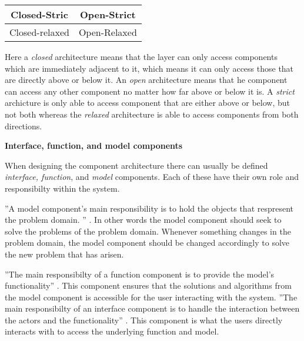 \begin{center}
	\begin{tabular}{| c | c |}
		\hline
		Closed-Stric & Open-Strict \\
		\hline
		Closed-relaxed & Open-Relaxed \\
		\hline
	\end{tabular}
\end{center}

Here a \textit{closed} architecture means that the layer can only access components which are immediately adjacent to it, which means it can only access those that are directly above or below it.
An \textit{open} architecture means that he component can access any other component no matter how far above or below it is.
A \textit{strict} archicture is only able to access component that are either above or below, but not both whereas the \textit{relaxed} architecture is able to access components from both directions.

\textbf{Interface, function, and model components}

When designing the component architecture there can usually be defined \textit{interface, function}, and \textit{model} components.
Each of these have their own role and responsibilty within the system.

''A model component's main responsibility is to hold the objects that respresent the problem domain. '' \citep[p.~203]{Rod-Aalborg}.
In other words the model component should seek to solve the problems of the problem domain. 
Whenever something changes in the problem domain, the model component should be changed accordingly to solve the new problem that has arisen.

''The main responsibilty of a function component is to provide the model's functionality'' \citep[p.~205]{Rod-Aalborg}.
This component ensures that the solutions and algorithms from the model component is accessible for the user interacting with the system.
''The main responsibilty of an interface component is to handle the interaction between the actors and the functionality'' \citep[p.~207]{Rod-Aalborg}.
This component is what the users directly interacts with to access the underlying function and model.

